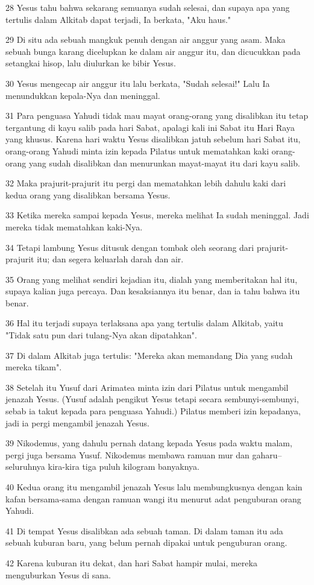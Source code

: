 \par 28 Yesus tahu bahwa sekarang semuanya sudah selesai, dan supaya apa yang tertulis dalam Alkitab dapat terjadi, Ia berkata, "Aku haus."
\par 29 Di situ ada sebuah mangkuk penuh dengan air anggur yang asam. Maka sebuah bunga karang dicelupkan ke dalam air anggur itu, dan dicucukkan pada setangkai hisop, lalu diulurkan ke bibir Yesus.
\par 30 Yesus mengecap air anggur itu lalu berkata, "Sudah selesai!" Lalu Ia menundukkan kepala-Nya dan meninggal.
\par 31 Para penguasa Yahudi tidak mau mayat orang-orang yang disalibkan itu tetap tergantung di kayu salib pada hari Sabat, apalagi kali ini Sabat itu Hari Raya yang khusus. Karena hari waktu Yesus disalibkan jatuh sebelum hari Sabat itu, orang-orang Yahudi minta izin kepada Pilatus untuk mematahkan kaki orang-orang yang sudah disalibkan dan menurunkan mayat-mayat itu dari kayu salib.
\par 32 Maka prajurit-prajurit itu pergi dan mematahkan lebih dahulu kaki dari kedua orang yang disalibkan bersama Yesus.
\par 33 Ketika mereka sampai kepada Yesus, mereka melihat Ia sudah meninggal. Jadi mereka tidak mematahkan kaki-Nya.
\par 34 Tetapi lambung Yesus ditusuk dengan tombak oleh seorang dari prajurit-prajurit itu; dan segera keluarlah darah dan air.
\par 35 Orang yang melihat sendiri kejadian itu, dialah yang memberitakan hal itu, supaya kalian juga percaya. Dan kesaksiannya itu benar, dan ia tahu bahwa itu benar.
\par 36 Hal itu terjadi supaya terlaksana apa yang tertulis dalam Alkitab, yaitu "Tidak satu pun dari tulang-Nya akan dipatahkan".
\par 37 Di dalam Alkitab juga tertulis: "Mereka akan memandang Dia yang sudah mereka tikam".
\par 38 Setelah itu Yusuf dari Arimatea minta izin dari Pilatus untuk mengambil jenazah Yesus. (Yusuf adalah pengikut Yesus tetapi secara sembunyi-sembunyi, sebab ia takut kepada para penguasa Yahudi.) Pilatus memberi izin kepadanya, jadi ia pergi mengambil jenazah Yesus.
\par 39 Nikodemus, yang dahulu pernah datang kepada Yesus pada waktu malam, pergi juga bersama Yusuf. Nikodemus membawa ramuan mur dan gaharu--seluruhnya kira-kira tiga puluh kilogram banyaknya.
\par 40 Kedua orang itu mengambil jenazah Yesus lalu membungkusnya dengan kain kafan bersama-sama dengan ramuan wangi itu menurut adat penguburan orang Yahudi.
\par 41 Di tempat Yesus disalibkan ada sebuah taman. Di dalam taman itu ada sebuah kuburan baru, yang belum pernah dipakai untuk penguburan orang.
\par 42 Karena kuburan itu dekat, dan hari Sabat hampir mulai, mereka menguburkan Yesus di sana.

